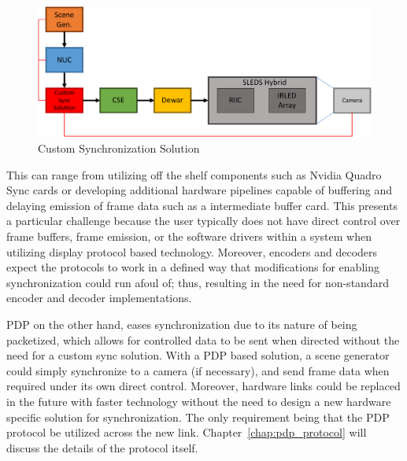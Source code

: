     \begin{figure}
        \centering
        \includegraphics[width=1.0\textwidth]{fig/custom_sync.pdf}
        \caption{Custom Synchronization Solution}
        \label{fig:custom_sync}
    \end{figure}

    This can range from utilizing off the shelf components such as Nvidia Quadro Sync cards\cite{NVIDIAQuadroSync} or developing additional hardware pipelines capable of buffering and delaying emission of frame data such as a intermediate buffer card. This presents a particular challenge because the user typically does not have direct control over frame buffers, frame emission, or the software drivers within a system when utilizing display protocol based technology. Moreover, encoders and decoders expect the protocols to work in a defined way that modifications for enabling synchronization could run afoul of; thus, resulting in the need for non-standard encoder and decoder implementations.

    PDP on the other hand, eases synchronization due to its nature of being packetized, which allows for controlled data to be sent when directed without the need for a custom sync solution. With a PDP based solution, a scene generator could simply synchronize to a camera (if necessary), and send frame data when required under its own direct control. Moreover, hardware links could be replaced in the future with faster technology without the need to design a new hardware specific solution for synchronization. The only requirement being that the PDP protocol be utilized across the new link. Chapter~\ref{chap:pdp_protocol} will discuss the details of the protocol itself.
